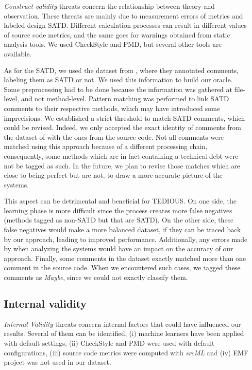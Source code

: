 
\textit{Construct validity} threats concern the relationship between theory and observation. These threats are mainly due to measurement errors of metrics and labeled design SATD. Different calculation processes can result in different values of source code metrics, and the same goes for warnings obtained from static analysis tools. We used CheckStyle and PMD, but several other tools are available. 

As for the SATD, we used the dataset from \citet{maldonado17}, where they annotated comments, labeling them as SATD or not. We used this information to build our oracle. Some preprocessing had to be done because the information was gathered at file-level, and not method-level. Pattern matching was performed to link SATD comments to their respective methods, which may have introduced some imprecisions. We established a strict threshold to match SATD comments, which could be revised. Indeed, we only accepted the exact identity of comments from the dataset of \citet{maldonado17} with the ones from the source code. Not all comments were matched using this approach because of a different processing chain, consequently, some methods which are in fact containing a technical debt were not be tagged as such. In the future, we plan to revise those matches which are close to being perfect but are not, to draw a more accurate picture of the systems. 

This aspect can be detrimental and beneficial for TEDIOUS. On one side, the learning phase is more difficult since the process creates more false negatives (methods tagged as non-SATD but that are SATD). On the other side, these false negatives would make a more balanced dataset, if they can be traced back by our approach, leading to improved performance. Additionally, any errors made by \citet{maldonado17} when analyzing the systems would have an impact on the accuracy of our approach. Finally, some comments in the dataset exactly matched more than one comment in the source code. When we encountered such cases, we tagged these comments as \textit{Maybe}, since we could not exactly classify them.

\subsection{Internal validity}


\textit{Internal Validity} threats concern internal factors that could have influenced our results. Several of them can be identified, (i) machine learners have been applied with default settings, (ii) CheckStyle and PMD were used with default configurations, (iii) source code metrics were computed with \textit{srcML} and (iv) \textsc{EMF} project was not used in our dataset.

